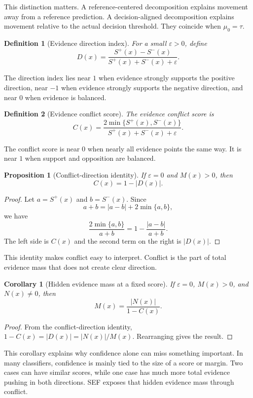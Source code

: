 \documentclass[11pt]{article}
\newtheorem{definition}{Definition}
\newtheorem{proposition}{Proposition}
\newtheorem{corollary}{Corollary}
\begin{document}
This distinction matters. A reference-centered decomposition explains movement
away from a reference prediction. A decision-aligned decomposition explains
movement relative to the actual decision threshold. They coincide when
$\mu_0=\tau$.

\begin{definition}[Evidence direction index]
For a small $\varepsilon>0$, define
\[
D(x)=\frac{S^+(x)-S^-(x)}
{S^+(x)+S^-(x)+\varepsilon}.
\]
\end{definition}

The direction index lies near $1$ when evidence strongly supports the positive direction, near $-1$ when evidence strongly supports the negative direction, and near $0$ when evidence is balanced.

\begin{definition}[Evidence conflict score]
The evidence conflict score is
\[
C(x)=
\frac{2\min\{S^+(x),S^-(x)\}}
{S^+(x)+S^-(x)+\varepsilon}.
\]
\end{definition}

The conflict score is near $0$ when nearly all evidence points the same way. It is near $1$ when support and opposition are balanced.

\begin{proposition}[Conflict-direction identity]
If $\varepsilon=0$ and $M(x)>0$, then
\[
C(x)=1-|D(x)|.
\]
\end{proposition}

\begin{proof}
Let $a=S^+(x)$ and $b=S^-(x)$. Since
\[
a+b=|a-b|+2\min\{a,b\},
\]
we have
\[
\frac{2\min\{a,b\}}{a+b}
=1-\frac{|a-b|}{a+b}.
\]
The left side is $C(x)$ and the second term on the right is $|D(x)|$.
\end{proof}

This identity makes conflict easy to interpret. Conflict is the part of total evidence mass that does not create clear direction.

\begin{corollary}[Hidden evidence mass at a fixed score]
If $\varepsilon=0$, $M(x)>0$, and $N(x)\neq 0$, then
\[
M(x)=\frac{|N(x)|}{1-C(x)}.
\]
\end{corollary}

\begin{proof}
From the conflict-direction identity, $1-C(x)=|D(x)|=|N(x)|/M(x)$. Rearranging gives the result.
\end{proof}

This corollary explains why confidence alone can miss something important. In many classifiers, confidence is mainly tied to the size of a score or margin. Two cases can have similar scores, while one case has much more total evidence pushing in both directions. SEF exposes that hidden evidence mass through conflict.
\end{document}
